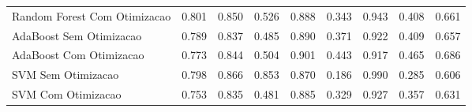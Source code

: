\begin{table}[H]
\begin{adjustwidth}{ -1in }{ -1in }
\begin{tabular}{lrrrrrrrr}
      Random Forest Com Otimizacao &                        0.801 &                         0.850 &                            0.526 &                            0.888 &                          0.343 &                          0.943 &                                     0.408 &                                 0.661 \\
           AdaBoost Sem Otimizacao &                        0.789 &                         0.837 &                            0.485 &                            0.890 &                          0.371 &                          0.922 &                                     0.409 &                                 0.657 \\
           AdaBoost Com Otimizacao &                        0.773 &                         0.844 &                            0.504 &                            0.901 &                          0.443 &                          0.917 &                                     0.465 &                                 0.686 \\
                SVM Sem Otimizacao &                        0.798 &                         0.866 &                            0.853 &                            0.870 &                          0.186 &                          0.990 &                                     0.285 &                                 0.606 \\
                SVM Com Otimizacao &                        0.753 &                         0.835 &                            0.481 &                            0.885 &                          0.329 &                          0.927 &                                     0.357 &                                 0.631 \\
\bottomrule
\end{tabular}
    \end{adjustwidth}
    \renewcommand{\arraystretch}{1.0} %
\end{table}
